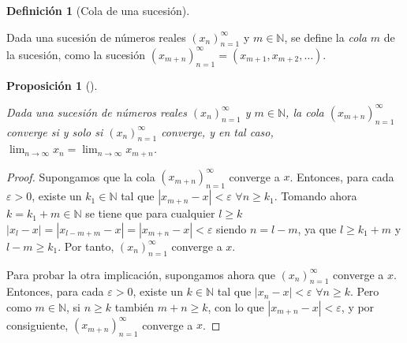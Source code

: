 \documentclass[
  a4paper,
]{scrreport}
\theoremstyle{definition}
\theoremstyle{plain}
\theoremstyle{definition}
\newtheorem{definition}{Definición}[chapter]
\theoremstyle{plain}
\theoremstyle{plain}
\newtheorem{proposition}{Proposición}[chapter]
\theoremstyle{remark}
\begin{document}
\leavevmode{}%
\begin{definition}[Cola de una sucesión]\label{def-cola-sucesion}

Dada una sucesión de números reales \((x_n)_{n=1}^\infty\) y
\(m\in\mathbb{N}\), se define la \emph{cola} \(m\) de la sucesión, como
la sucesión \((x_{m+n})_{n=1}^\infty = (x_{m+1}, x_{m+2},\ldots)\).

\end{definition}

\leavevmode{}%
\begin{proposition}[]\label{prp-convergencia-cola-sucesion}

Dada una sucesión de números reales \((x_n)_{n=1}^\infty\) y
\(m\in\mathbb{N}\), la cola \((x_{m+n})_{n=1}^\infty\) converge si y
solo si \((x_n)_{n=1}^\infty\) converge, y en tal caso,
\(\lim_{n\to\infty}x_n=\lim_{n\to\infty}x_{m+n}\).

\end{proposition}

\begin{tcolorbox}[enhanced jigsaw, breakable, arc=.35mm, colbacktitle=quarto-callout-note-color!10!white, toptitle=1mm, opacityback=0, colframe=quarto-callout-note-color-frame, colback=white, left=2mm, bottomrule=.15mm, opacitybacktitle=0.6, title=\textcolor{quarto-callout-note-color}{\faInfo}\hspace{0.5em}{Demostración}, toprule=.15mm, titlerule=0mm, coltitle=black, rightrule=.15mm, bottomtitle=1mm, leftrule=.75mm]

\begin{proof}

Supongamos que la cola \((x_{m+n})_{n=1}^\infty\) converge a \(x\).
Entonces, para cada \(\varepsilon>0\), existe un \(k_1\in\mathbb{N}\)
tal que \(|x_{m+n}-x|<\varepsilon\) \(\forall n\geq k_1\). Tomando ahora
\(k=k_1+m\in\mathbb{N}\) se tiene que para cualquier \(l\geq k\)
\(|x_l-x| = |x_{l-m+m}-x| = |x_{m+n}-x| < \varepsilon\) siendo
\(n=l-m\), ya que \(l\geq k_1+m\) y \(l-m\geq k_1\). Por tanto,
\((x_n)_{n=1}^\infty\) converge a \(x\).

Para probar la otra implicación, supongamos ahora que
\((x_n)_{n=1}^\infty\) converge a \(x\). Entonces, para cada
\(\varepsilon>0\), existe un \(k\in\mathbb{N}\) tal que
\(|x_n-x|<\varepsilon\) \(\forall n\geq k\). Pero como
\(m\in\mathbb{N}\), si \(n\geq k\) también \(m+n\geq k\), con lo que
\(|x_{m+n}-x|<\varepsilon\), y por consiguiente,
\((x_{m+n})_{n=1}^\infty\) converge a \(x\).

\end{proof}

\end{tcolorbox}
\end{document}
